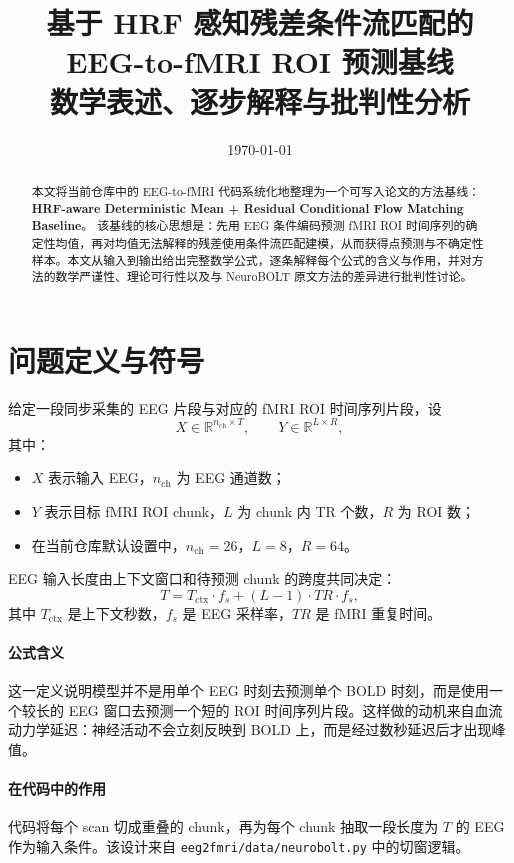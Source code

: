 \documentclass[11pt,a4paper]{ctexart}
\title{基于 HRF 感知残差条件流匹配的 EEG-to-fMRI ROI 预测基线\\
\large 数学表述、逐步解释与批判性分析}
\author{}
\date{\today}
\newcommand{\R}{\mathbb{R}}
\begin{document}
\maketitle

\begin{abstract}
本文将当前仓库中的 EEG-to-fMRI 代码系统化地整理为一个可写入论文的方法基线：
\textbf{HRF-aware Deterministic Mean + Residual Conditional Flow Matching Baseline}。
该基线的核心思想是：先用 EEG 条件编码预测 fMRI ROI 时间序列的确定性均值，再对均值无法解释的残差使用条件流匹配建模，从而获得点预测与不确定性样本。本文从输入到输出给出完整数学公式，逐条解释每个公式的含义与作用，并对方法的数学严谨性、理论可行性以及与 NeuroBOLT 原文方法的差异进行批判性讨论。
\end{abstract}

\section{问题定义与符号}

给定一段同步采集的 EEG 片段与对应的 fMRI ROI 时间序列片段，设
\begin{equation}
X \in \R^{n_{\mathrm{ch}} \times T}, \qquad
Y \in \R^{L \times R},
\end{equation}
其中：
\begin{itemize}
  \item $X$ 表示输入 EEG，$n_{\mathrm{ch}}$ 为 EEG 通道数；
  \item $Y$ 表示目标 fMRI ROI chunk，$L$ 为 chunk 内 TR 个数，$R$ 为 ROI 数；
  \item 在当前仓库默认设置中，$n_{\mathrm{ch}}=26$，$L=8$，$R=64$。
\end{itemize}

EEG 输入长度由上下文窗口和待预测 chunk 的跨度共同决定：
\begin{equation}
T = T_{\mathrm{ctx}} \cdot f_s + (L-1)\cdot TR \cdot f_s,
\end{equation}
其中 $T_{\mathrm{ctx}}$ 是上下文秒数，$f_s$ 是 EEG 采样率，$TR$ 是 fMRI 重复时间。

\paragraph{公式含义}
这一定义说明模型并不是用单个 EEG 时刻去预测单个 BOLD 时刻，而是使用一个较长的 EEG 窗口去预测一个短的 ROI 时间序列片段。这样做的动机来自血流动力学延迟：神经活动不会立刻反映到 BOLD 上，而是经过数秒延迟后才出现峰值。

\paragraph{在代码中的作用}
代码将每个 scan 切成重叠的 chunk，再为每个 chunk 抽取一段长度为 $T$ 的 EEG 作为输入条件。该设计来自 \texttt{eeg2fmri/data/neurobolt.py} 中的切窗逻辑。
\end{document}
